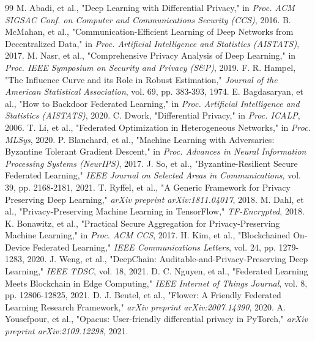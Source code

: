 \documentclass[10pt, a4paper, twocolumn]{article}
\begin{document}
\footnotesize
\begin{thebibliography}{99}
\itemsep=0pt
 M. Abadi, et al., "Deep Learning with Differential Privacy," in \textit{Proc. ACM SIGSAC Conf. on Computer and Communications Security (CCS)}, 2016.
 B. McMahan, et al., "Communication-Efficient Learning of Deep Networks from Decentralized Data," in \textit{Proc. Artificial Intelligence and Statistics (AISTATS)}, 2017.
 M. Nasr, et al., "Comprehensive Privacy Analysis of Deep Learning," in \textit{Proc. IEEE Symposium on Security and Privacy (S\&P)}, 2019.
 F. R. Hampel, "The Influence Curve and its Role in Robust Estimation," \textit{Journal of the American Statistical Association}, vol. 69, pp. 383-393, 1974.
 E. Bagdasaryan, et al., "How to Backdoor Federated Learning," in \textit{Proc. Artificial Intelligence and Statistics (AISTATS)}, 2020.
 C. Dwork, "Differential Privacy," in \textit{Proc. ICALP}, 2006.
 T. Li, et al., "Federated Optimization in Heterogeneous Networks," in \textit{Proc. MLSys}, 2020.
 P. Blanchard, et al., "Machine Learning with Adversaries: Byzantine Tolerant Gradient Descent," in \textit{Proc. Advances in Neural Information Processing Systems (NeurIPS)}, 2017.
 J. So, et al., "Byzantine-Resilient Secure Federated Learning," \textit{IEEE Journal on Selected Areas in Communications}, vol. 39, pp. 2168-2181, 2021.
 T. Ryffel, et al., "A Generic Framework for Privacy Preserving Deep Learning," \textit{arXiv preprint arXiv:1811.04017}, 2018.
 M. Dahl, et al., "Privacy-Preserving Machine Learning in TensorFlow," \textit{TF-Encrypted}, 2018.
 K. Bonawitz, et al., "Practical Secure Aggregation for Privacy-Preserving Machine Learning," in \textit{Proc. ACM CCS}, 2017.
 H. Kim, et al., "Blockchained On-Device Federated Learning," \textit{IEEE Communications Letters}, vol. 24, pp. 1279-1283, 2020.
 J. Weng, et al., "DeepChain: Auditable-and-Privacy-Preserving Deep Learning," \textit{IEEE TDSC}, vol. 18, 2021.
 D. C. Nguyen, et al., "Federated Learning Meets Blockchain in Edge Computing," \textit{IEEE Internet of Things Journal}, vol. 8, pp. 12806-12825, 2021.
 D. J. Beutel, et al., "Flower: A Friendly Federated Learning Research Framework," \textit{arXiv preprint arXiv:2007.14390}, 2020.
 A. Yousefpour, et al., "Opacus: User-friendly differential privacy in PyTorch," \textit{arXiv preprint arXiv:2109.12298}, 2021.

\end{thebibliography}
\end{document}
